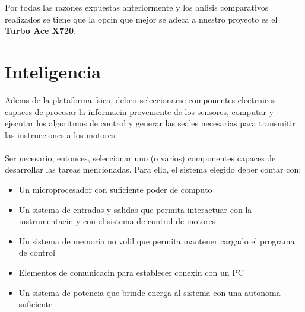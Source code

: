 \documentclass[spanish,12pt,a4paper,titlepage]{report}
\begin{document}
	Por todas las razones expuestas anteriormente y los anlisis comparativos realizados se tiene que la opcin que mejor se adeca a nuestro proyecto es el \textbf{Turbo Ace X720}. 

\newpage
\section{Inteligencia}
\vspace*{15pt}

Adems de la plataforma fsica, deben seleccionarse componentes electrnicos capaces de procesar la informacin proveniente de los sensores, computar y ejecutar los algoritmos de control y generar las seales necesarias para transmitir las instrucciones a los motores.\\
\\
Ser necesario, entonces, seleccionar uno (o varios) componentes capaces de desarrollar las tareas mencionadas. Para ello, el sistema elegido deber contar con:

\begin{itemize}
\item Un microprocesador con suficiente poder de computo
\item Un sistema de entradas y salidas que permita interactuar con la instrumentacin y con el sistema de control de motores
\item Un sistema de memoria no volil que permita mantener cargado el programa de control
\item Elementos de comunicacin para establecer conexin con un PC
\item Un sistema de potencia que brinde energa al sistema con una autonoma suficiente
\end{itemize}
\end{document}
